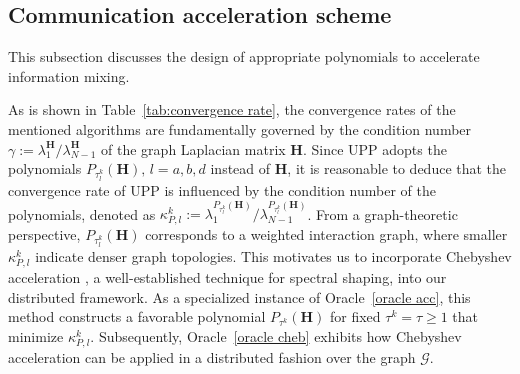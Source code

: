 \documentclass[12pt,draftcls,onecolumn]{IEEEtran}
\newcommand{\bH}{{\mathbf{H}}}
\begin{document}
\subsection{Communication acceleration scheme}\label{subsection: Chebyshev}

This subsection discusses the design of appropriate polynomials to accelerate information mixing.

As is shown in Table~\ref{tab:convergence rate}, the convergence rates of the mentioned algorithms are fundamentally governed by the condition number $\gamma:=\lambda_1^\bH/\lambda_{N-1}^\bH$ of the graph Laplacian matrix $\bH$. Since UPP adopts the polynomials $P_{\tau_l^k}(\bH),\,l=a,b,d$ instead of $\mathbf{H}$, it is reasonable to deduce that the convergence rate of UPP is influenced by the condition number of the polynomials, denoted as $\kappa_{P,l}^k:=\lambda_1^{P_{\tau_l^k}(\mathbf{H})}/\lambda_{N-1}^{P_{\tau_l^k}(\mathbf{H})}$. From a graph-theoretic perspective, $P_{\tau_l^k}(\mathbf{H})$ corresponds to a weighted interaction graph, where smaller $\kappa_{P,l}^k$ indicate denser graph topologies. This motivates us to incorporate Chebyshev acceleration \cite{auzinger2011iterative}, a well-established technique for spectral shaping, into our distributed framework. As a specialized instance of Oracle~\ref{oracle acc}, this method constructs a favorable polynomial $P_{\tau^k}(\mathbf{H})$ for fixed $\tau^k=\tau\geq 1$ that minimize $\kappa_{P,l}^k$. Subsequently, Oracle~\ref{oracle cheb} exhibits how Chebyshev acceleration can be applied in a distributed fashion over the graph $\mathcal{G}$.
\end{document}
